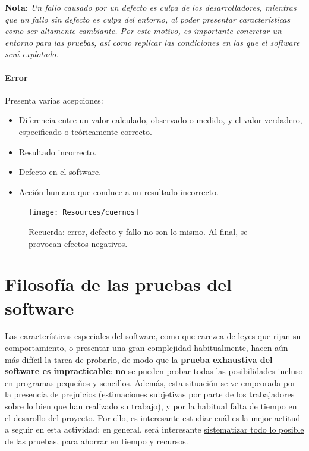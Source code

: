 \textbf{Nota:} \textit{Un fallo causado por un defecto es culpa de los desarrolladores, mientras que un fallo sin defecto es culpa del entorno, al poder presentar características como ser altamente cambiante. Por este motivo, es importante concretar un entorno para las pruebas, así como replicar las condiciones en las que el software será explotado.}

\paragraph{Error} Presenta varias acepciones:
\begin{itemize}
    \item Diferencia entre un valor calculado, observado o medido, y el valor verdadero, especificado o teóricamente correcto.
    \item Resultado incorrecto.
    \item Defecto en el software.
    \item Acción humana que conduce a un resultado incorrecto.
\end{itemize}

\begin{figure}[H]
    \centering
    \texttt{[image: Resources/cuernos]}
    \caption{Recuerda: error, defecto y fallo no son lo mismo. Al final, se provocan efectos negativos.}
    \label{fig:cuernos}
\end{figure}


\section{Filosofía de las pruebas del software}

Las características especiales del software, como que carezca de leyes que rijan su comportamiento, o presentar una gran complejidad habitualmente, hacen aún más difícil la tarea de probarlo, de modo que la \textbf{prueba exhaustiva del software es impracticable}: \textbf{no} se pueden probar todas las posibilidades incluso en programas pequeños y sencillos. Además, esta situación se ve empeorada por la presencia de prejuicios (estimaciones subjetivas por parte de los trabajadores sobre lo bien que han realizado su trabajo), y por la habitual falta de tiempo en el desarollo del proyecto. Por ello, es interesante estudiar cuál es la mejor actitud a seguir en esta actividad; en general, será interesante \uline{sistematizar todo lo posible} de las pruebas, para ahorrar en tiempo y recursos.\\

